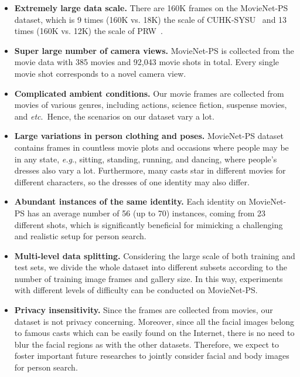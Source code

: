 \documentclass{article}
\def\eg{\emph{e.g}.} \def\Eg{\emph{E.g}.}
\def\etc{\emph{etc}.} \def\vs{\emph{vs}.}
\begin{document}
\begin{itemize}
    \item \textbf{Extremely large data scale.} There are 160K frames on the MovieNet-PS dataset, which is 9 times (160K vs. 18K) the scale of CUHK-SYSU~\cite{OIM} and 13 times (160K vs. 12K) the scale of PRW~\cite{PRW}.

    \item \textbf{Super large number of camera views.} MovieNet-PS is collected from the movie data with 385 movies and 92,043 movie shots in total. Every single movie shot corresponds to a novel camera view.

    \item \textbf{Complicated ambient conditions.} Our movie frames are collected from movies of various genres, including actions, science fiction, suspense movies, and \etc{}~Hence, the scenarios on our dataset vary a lot.

    \item \textbf{Large variations in person clothing and poses.} MovieNet-PS dataset contains frames in countless movie plots and occasions where people may be in any state, \eg, sitting, standing, running, and dancing, where people's dresses also vary a lot. Furthermore, many casts star in different movies for different characters, so the dresses of one identity may also differ.

    \item \textbf{Abundant instances of the same identity.} Each identity on MovieNet-PS has an average number of 56 (up to 70) instances, coming from 23 different shots, which is significantly beneficial for mimicking a challenging and realistic setup for person search.
    
    \item \textbf{Multi-level data splitting.} Considering the large scale of both training and test sets, we divide the whole dataset into different subsets according to the number of training image frames and gallery size. In this way, experiments with different levels of difficulty can be conducted on MovieNet-PS.
    
    \item \textbf{Privacy insensitivity.} Since the frames are collected from movies, our dataset is not privacy concerning. Moreover, since all the facial images belong to famous casts which can be easily found on the Internet, there is no need to blur the facial regions as with the other datasets. Therefore, we expect to foster important future researches to jointly consider facial and body images for person search.
    
\end{itemize}
\end{document}

